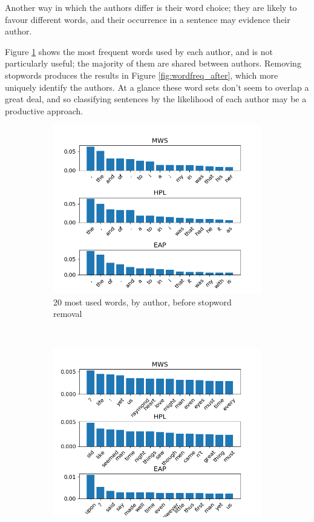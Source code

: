 Another way in which the authors differ is their word choice; they are likely to favour different words, and their occurrence in a sentence may evidence their author.

Figure \ref{fig:wordfreq_before} shows the most frequent words used by each author, and is not particularly useful; the majority of them are shared between authors. Removing stopwords produces the results in Figure \ref{fig:wordfreq_after}, which more uniquely identify the authors. At a glance these word sets don't seem to overlap a great deal, and so classifying sentences by the likelihood of each author may be a productive approach.

\begin{figure}[b]
\centering
\begin{subfigure}[b]{\columnwidth}
\includegraphics[width=\textwidth]{Figures/Data_Structure/wordfreq_before.png}
\caption{20 most used words, by author, before stopword removal}
\label{fig:wordfreq_before}
\end{subfigure} \\
\begin{subfigure}[b]{\columnwidth}
\includegraphics[width=\textwidth]{Figures/Data_Structure/wordfreq_after.png}

\end{subfigure}
\end{figure}
